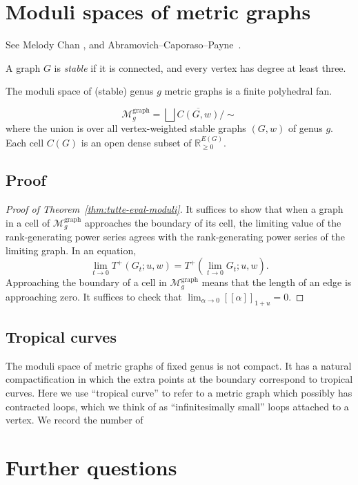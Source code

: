 \documentclass{amsart}
\theoremstyle{definition}
\newcommand{\RR}{\mathbb{R}}
\newcommand{\RRnneg}{\RR_{\geq 0}}
\newcommand{\fanalog}[2]{[\![#2]\!]_{#1}}
\newcommand{\ufanalog}[1]{\fanalog{1 + u}{#1}}
\newcommand{\Mgraphg}{\mathcal M_g^{\mathrm{graph}}}
\newcommand{\Mggraph}{\Mgraphg}
\begin{document}
\section{Moduli spaces of metric graphs}
See Melody Chan \cite{Cha},
and Abramovich--Caporaso--Payne~\cite{ACP}.

A graph $G$ is {\em stable} if it is connected, and every vertex has degree at least three.
 
The moduli space of (stable) genus $g$ metric graphs is a finite polyhedral fan.


\[
	\Mggraph = \bigsqcup \overline{C(G, w)} / \sim
\]
where the union is over all vertex-weighted stable graphs $(G, w)$ of genus $g$.
Each cell $C(G)$ is an open dense subset of $\RRnneg^{E(G)}$.


\subsection{Proof}
\begin{proof}[Proof of Theorem~\ref{thm:tutte-eval-moduli}]
It suffices to show that when a graph in a cell of $\Mggraph$ approaches the boundary of its cell, the limiting value of the rank-generating power series agrees with the rank-generating power series of the limiting graph.
In an equation,
\[
	\lim_{t \to 0} T^+(G_t; u, w) = T^+(\lim_{t \to 0} G_t; u, w).
\]
Approaching the boundary of a cell in $\Mggraph$ means that the length of an edge is approaching zero.
It suffices to check that $\lim_{\alpha \to 0} \ufanalog{\alpha} = 0$.
\end{proof}

\subsection{Tropical curves}

The moduli space of metric graphs of fixed genus is not compact. 
It has a natural compactification in which the extra points at the boundary correspond to tropical curves.
Here we use ``tropical curve'' 
to refer to a metric graph which possibly has contracted loops,
which we think of as ``infinitesimally small'' loops attached to a vertex.
We record the number of 


\section{Further questions}
\end{document}
